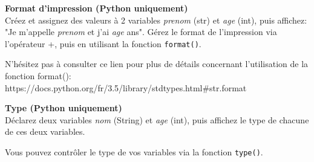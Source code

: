 \begin{Exercice}[5 minutes] \textbf{Format d'impression (Python uniquement)}\\
   Créez et assignez des valeurs à 2 variables \textit{prenom} (str) et \textit{age} (int), puis affichez: "Je m'appelle \textit{prenom} et j'ai \textit{age} ans". Gérez le format de l'impression via l'opérateur +, puis en utilisant la fonction \lstinline{format()}. \\
   
    \begin{conseil}
       N'hésitez pas à consulter ce lien pour plus de détails concernant l'utilisation de la fonction format(): \\
        https://docs.python.org/fr/3.5/library/stdtypes.html\#str.format 
        
    \end{conseil}
    \begin{solution}
     
    
           
    \end{solution}   
\end{Exercice}

\begin{Exercice}[3 minutes] \textbf{Type (Python uniquement)}\\
   Déclarez deux variables \textit{nom} (String) et \textit{age} (int), puis affichez le type de chacune de ces deux variables.
   
    \begin{conseil}
       Vous pouvez contrôler le type de vos variables via la fonction \lstinline{type()}.
        
    \end{conseil}
    \begin{solution}
     
    
           
    \end{solution}   
\end{Exercice}

